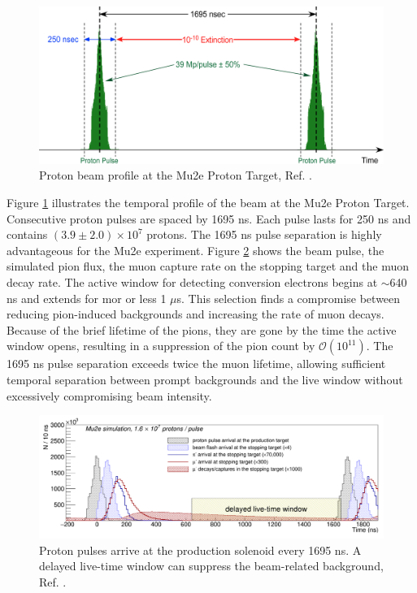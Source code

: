 \begin{figure}[!h]
\centering
\includegraphics[width =\textwidth]{images/chapter2/Screenshot_20240301_151148.png}
\caption{Proton beam profile at the Mu2e Proton Target, Ref. \cite{accelerator}.}
\label{fig:beamprofile}
\end{figure}
Figure \ref{fig:beamprofile} illustrates the temporal profile of the beam at the Mu2e Proton Target. Consecutive proton pulses are spaced by 1695 ns. Each pulse lasts for 250 ns and contains $(3.9 \pm 2.0 )\times 10^7$ protons. The 1695 ns pulse separation is highly advantageous for the Mu2e experiment. Figure \ref{fig:beamwindow} shows the beam pulse, the simulated pion flux, the muon capture rate on the stopping target and the muon decay rate. The active window for detecting conversion electrons begins at $\sim$640 ns and extends for mor or less 1 $\mu$s. This selection finds a compromise between reducing pion-induced backgrounds  and increasing the rate of muon decays. Because of the brief lifetime of the pions, they are gone by the time the active window opens, resulting in a suppression of the pion count by $\mathcal{O}(10^{11})$. The 1695 ns pulse separation exceeds twice the muon lifetime, allowing sufficient temporal separation between prompt backgrounds and the live window without excessively compromising beam intensity.
\begin{figure}[!h]
\centering
\includegraphics[width =\textwidth]{images/chapter2/Screenshot_20240301_164649.png}
\caption{Proton pulses arrive at the production solenoid every 1695 ns. A delayed live-time window can suppress the beam-related background, Ref. \cite{universe9010054}.}
\label{fig:beamwindow}
\end{figure}
